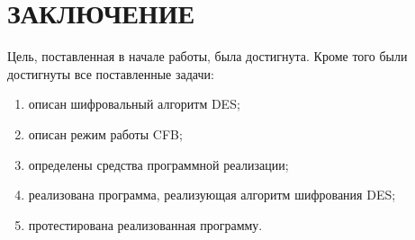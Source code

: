 \chapter*{\hfill{\centering  ЗАКЛЮЧЕНИЕ}\hfill}

Цель, поставленная в начале работы, была достигнута. 
Кроме того были достигнуты все поставленные задачи:
\begin{enumerate}
	\item описан шифровальный алгоритм DES;
	\item описан режим работы CFB;
	\item определены средства программной реализации;
	\item реализована программа, реализующая алгоритм шифрования DES;
	\item протестирована реализованная программу.
\end{enumerate}
